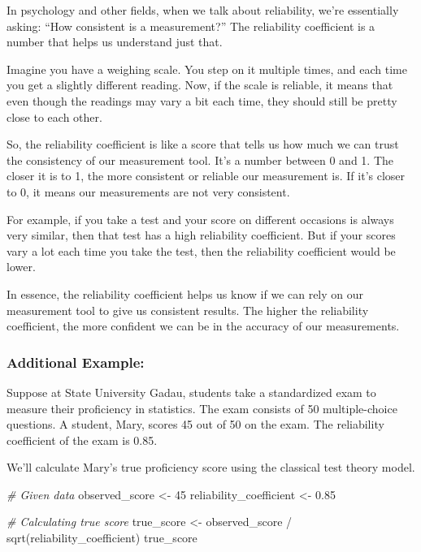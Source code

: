 \documentclass[
]{article}
\newenvironment{Shaded}{\begin{snugshade}}{\end{snugshade}}
\newcommand{\CommentTok}[1]{\textcolor[rgb]{0.56,0.35,0.01}{\textit{#1}}}
\newcommand{\DecValTok}[1]{\textcolor[rgb]{0.00,0.00,0.81}{#1}}
\newcommand{\FloatTok}[1]{\textcolor[rgb]{0.00,0.00,0.81}{#1}}
\newcommand{\FunctionTok}[1]{\textcolor[rgb]{0.00,0.00,0.00}{#1}}
\newcommand{\NormalTok}[1]{#1}
\newcommand{\OtherTok}[1]{\textcolor[rgb]{0.56,0.35,0.01}{#1}}
\newcommand{\SpecialCharTok}[1]{\textcolor[rgb]{0.00,0.00,0.00}{#1}}
\begin{document}
In psychology and other fields, when we talk about reliability, we’re
essentially asking: “How consistent is a measurement?” The reliability
coefficient is a number that helps us understand just that.

Imagine you have a weighing scale. You step on it multiple times, and
each time you get a slightly different reading. Now, if the scale is
reliable, it means that even though the readings may vary a bit each
time, they should still be pretty close to each other.

So, the reliability coefficient is like a score that tells us how much
we can trust the consistency of our measurement tool. It’s a number
between 0 and 1. The closer it is to 1, the more consistent or reliable
our measurement is. If it’s closer to 0, it means our measurements are
not very consistent.

For example, if you take a test and your score on different occasions is
always very similar, then that test has a high reliability coefficient.
But if your scores vary a lot each time you take the test, then the
reliability coefficient would be lower.

In essence, the reliability coefficient helps us know if we can rely on
our measurement tool to give us consistent results. The higher the
reliability coefficient, the more confident we can be in the accuracy of
our measurements.

\hypertarget{additional-example}{%
\subsubsection{Additional Example:}\label{additional-example}}

Suppose at State University Gadau, students take a standardized exam to
measure their proficiency in statistics. The exam consists of 50
multiple-choice questions. A student, Mary, scores 45 out of 50 on the
exam. The reliability coefficient of the exam is 0.85.

We’ll calculate Mary’s true proficiency score using the classical test
theory model.

\begin{Shaded}
\begin{Highlighting}[]
\CommentTok{\# Given data}
\NormalTok{observed\_score }\OtherTok{\textless{}{-}} \DecValTok{45}
\NormalTok{reliability\_coefficient }\OtherTok{\textless{}{-}} \FloatTok{0.85}

\CommentTok{\# Calculating true score}
\NormalTok{true\_score }\OtherTok{\textless{}{-}}\NormalTok{ observed\_score }\SpecialCharTok{/} \FunctionTok{sqrt}\NormalTok{(reliability\_coefficient)}
\NormalTok{true\_score}
\end{Highlighting}
\end{Shaded}
\end{document}
